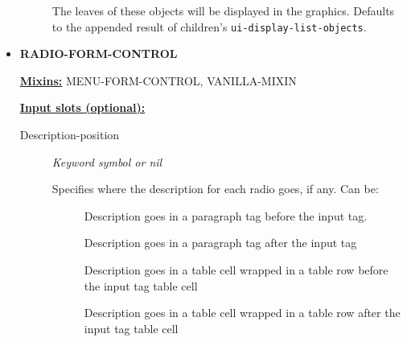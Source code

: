 \documentclass [11pt]{book}
\begin{document}
\begin{itemize}
\begin{description}
 The leaves of these objects will be
displayed in the graphics. Defaults to the appended result of children's
\texttt{ui-display-list-objects}.




\end{description}







\item {}
\textbf{RADIO-FORM-CONTROL}


\textbf{
\underline{Mixins:}} MENU-FORM-CONTROL, VANILLA-MIXIN





\begin{description}

\end{description}








\textbf{
\underline{Input slots (optional):}}

\begin{description}

\item [Description-position]
\emph{Keyword symbol or nil}

 Specifies where the description for each radio goes, if any.
Can be:


\begin{description}


\item[
]

Description goes in a paragraph tag before the input tag.


\item[
]

Description goes in a paragraph tag after the input tag


\item[
]

Description goes in a table cell wrapped in a table row before the input tag table cell


\item[
]

Description goes in a table cell wrapped in a table row after the input tag table cell



\end{description}
\end{description}
\end{itemize}
\end{document}

